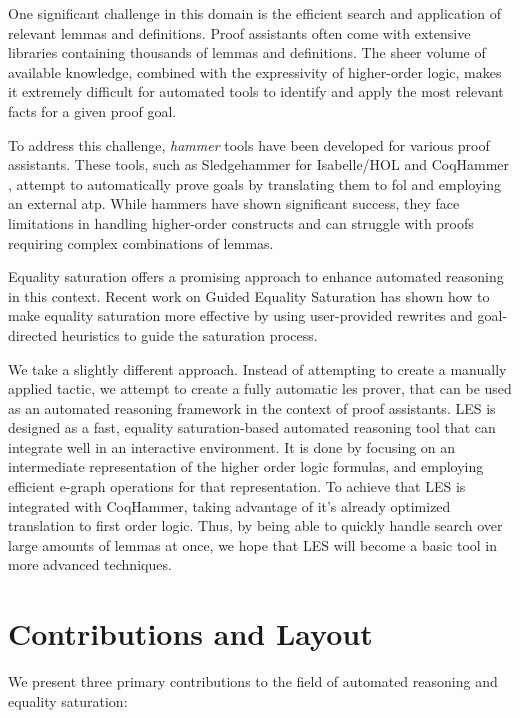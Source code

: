 One significant challenge in this domain is the efficient search and application of relevant lemmas and definitions. 
Proof assistants often come with extensive libraries containing thousands of lemmas and definitions. 
The sheer volume of available knowledge, combined with the expressivity of higher-order logic, makes it extremely difficult for automated tools to identify and apply the most relevant facts for a given proof goal.

To address this challenge, \emph{hammer} tools have been developed for various proof assistants. 
These tools, such as Sledgehammer for Isabelle/HOL \cite{sledgehammer} and CoqHammer \cite{coqhammer}, attempt to automatically prove goals by translating them to \gls{fol} and employing an external \gls{atp}. 
While hammers have shown significant success, they face limitations in handling higher-order constructs and can struggle with proofs requiring complex combinations of lemmas.

Equality saturation offers a promising approach to enhance automated reasoning in this context.
Recent work on Guided Equality Saturation \cite{guidedeqsat} has shown how to make equality saturation more effective by using user-provided rewrites and goal-directed heuristics to guide the saturation process.

We take a slightly different approach.
Instead of attempting to create a manually applied tactic, we attempt to create a fully automatic \gls{les} prover, that can be used as an automated reasoning framework in the context of proof assistants.
LES is designed as a fast, equality saturation-based automated reasoning tool that can integrate well in an interactive environment. 
It is done by focusing on an intermediate representation of the higher order logic formulas, and employing efficient e-graph operations for that representation.
To achieve that LES is integrated with CoqHammer, taking advantage of it's already optimized translation to first order logic.
Thus, by being able to quickly handle search over large amounts of lemmas at once, we hope that LES will become a basic tool in more advanced techniques.


\section{Contributions and Layout}

We present three primary contributions to the field of automated reasoning and equality saturation:

